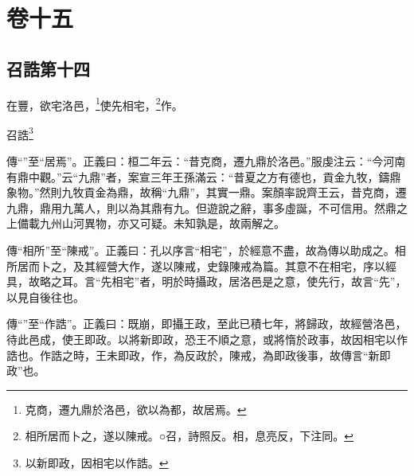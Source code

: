 

\chapter{卷十五}


\section{召誥第十四}


在豐，欲宅洛邑，\footnote{克商，遷九鼎於洛邑，欲以為都，故居焉。}使先相宅，\footnote{相所居而卜之，遂以陳戒。○召，詩照反。相，息亮反，下注同。}作。

召誥\footnote{以新即政，因相宅以作誥。}


{\noindent\zhuan{}\fzbyks 傳“”至“居焉”。正義曰：桓二年云：“昔克商，遷九鼎於洛邑。”服虔注云：“今河南有鼎中觀。”云“九鼎”者，案宣三年王孫滿云：“昔夏之方有德也，貢金九牧，鑄鼎象物。”然則九牧貢金為鼎，故稱“九鼎”，其實一鼎。案顏率說齊王云，昔克商，遷九鼎，鼎用九萬人，則以為其鼎有九。但遊說之辭，事多虛誕，不可信用。然鼎之上備載九州山河異物，亦又可疑。未知孰是，故兩解之。 \par}

{\noindent\zhuan{}\fzbyks 傳“相所”至“陳戒”。正義曰：孔以序言“相宅”，於經意不盡，故為傳以助成之。相所居而卜之，及其經營大作，遂以陳戒，史錄陳戒為篇。其意不在相宅，序以經具，故略之耳。言“先相宅”者，明於時攝政，居洛邑是之意，使先行，故言“先”，以見自後往也。 \par}

{\noindent\zhuan{}\fzbyks 傳“”至“作誥”。正義曰：既崩，即攝王政，至此已積七年，將歸政，故經營洛邑，待此邑成，使王即政。以將新即政，恐王不順之意，或將惰於政事，故因相宅以作誥也。作誥之時，王未即政，作，為反政於，陳戒，為即政後事，故傳言“新即政”也。 \par}

